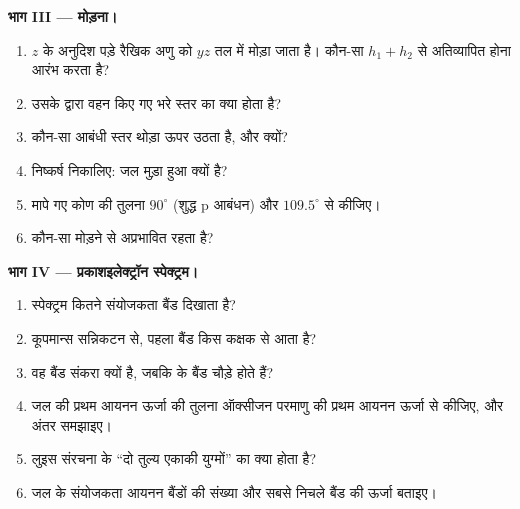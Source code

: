 \begin{problem}
\medskip
\noindent\textbf{भाग III --- मोड़ना।}
\begin{enumerate}[resume]
  \item $z$ के अनुदिश पड़े रैखिक अणु को $yz$ तल में मोड़ा जाता है। कौन-सा
         $h_1 + h_2$ से अतिव्यापित होना आरंभ करता है?
  \item उसके द्वारा वहन किए गए भरे स्तर का क्या होता है?
  \item कौन-सा आबंधी स्तर थोड़ा ऊपर उठता है, और क्यों?
  \item निष्कर्ष निकालिए: जल मुड़ा हुआ क्यों है?
  \item मापे गए कोण की तुलना $90^\circ$ (शुद्ध p आबंधन) और $109.5^\circ$ से कीजिए।
  \item कौन-सा  मोड़ने से अप्रभावित रहता है?
\end{enumerate}

\medskip
\noindent\textbf{भाग IV --- प्रकाशइलेक्ट्रॉन स्पेक्ट्रम।}
\begin{enumerate}[resume]
  \item स्पेक्ट्रम कितने संयोजकता बैंड दिखाता है?
  \item कूपमान्स सन्निकटन से, पहला बैंड किस कक्षक से आता है?
  \item वह बैंड संकरा क्यों है, जबकि  के बैंड चौड़े होते हैं?
  \item जल की प्रथम आयनन ऊर्जा की तुलना ऑक्सीजन
        परमाणु की प्रथम आयनन ऊर्जा से कीजिए, और अंतर समझाइए।
  \item लुइस संरचना के ``दो तुल्य एकाकी युग्मों'' का क्या होता है?
  \item जल के संयोजकता आयनन बैंडों की संख्या और सबसे निचले बैंड की ऊर्जा
        बताइए।
\end{enumerate}
\end{problem}
